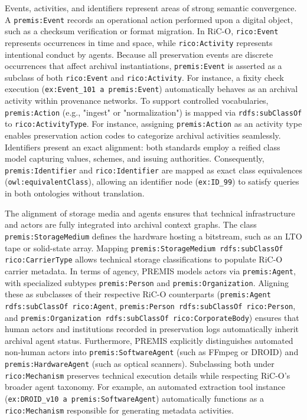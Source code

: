 \documentclass[runningheads]{llncs}
\begin{document}
Events, activities, and identifiers represent areas of strong semantic convergence. A \texttt{premis:Event} records an operational action performed upon a digital object, such as a checksum verification or format migration. In RiC-O, \texttt{rico:Event} represents occurrences in time and space, while \texttt{rico:Activity} represents intentional conduct by agents. Because all preservation events are discrete occurrences that affect archival instantiations, \texttt{premis:Event} is asserted as a subclass of both \texttt{rico:Event} and \texttt{rico:Activity}. For instance, a fixity check execution (\texttt{ex:Event\_101 a premis:Event}) automatically behaves as an archival activity within provenance networks. To support controlled vocabularies, \texttt{premis:Action} (e.g., "ingest" or "normalization") is mapped via \texttt{rdfs:subClassOf} to \texttt{rico:ActivityType}. For instance, assigning \texttt{premis:Action} as an activity type enables preservation action codes to categorize archival activities seamlessly. Identifiers present an exact alignment: both standards employ a reified class model capturing values, schemes, and issuing authorities. Consequently, \texttt{premis:Identifier} and \texttt{rico:Identifier} are mapped as exact class equivalences (\texttt{owl:equivalentClass}), allowing an identifier node (\texttt{ex:ID\_99}) to satisfy queries in both ontologies without translation.

The alignment of storage media and agents ensures that technical infrastructure and actors are fully integrated into archival context graphs. The class \texttt{premis:StorageMedium} defines the hardware hosting a bitstream, such as an LTO tape or solid-state array. Mapping \texttt{premis:StorageMedium rdfs:subClassOf rico:CarrierType} allows technical storage classifications to populate RiC-O carrier metadata. In terms of agency, PREMIS models actors via \texttt{premis:Agent}, with specialized subtypes \texttt{premis:Person} and \texttt{premis:Organization}. Aligning these as subclasses of their respective RiC-O counterparts (\texttt{premis:Agent rdfs:subClassOf rico:Agent}, \texttt{premis:Person rdfs:subClassOf rico:Person}, and \texttt{premis:Organization rdfs:subClassOf rico:CorporateBody}) ensures that human actors and institutions recorded in preservation logs automatically inherit archival agent status. Furthermore, PREMIS explicitly distinguishes automated non-human actors into \texttt{premis:SoftwareAgent} (such as FFmpeg or DROID) and \texttt{premis:HardwareAgent} (such as optical scanners). Subclassing both under \texttt{rico:Mechanism} preserves technical execution details while respecting RiC-O's broader agent taxonomy. For example, an automated extraction tool instance (\texttt{ex:DROID\_v10 a premis:SoftwareAgent}) automatically functions as a \texttt{rico:Mechanism} responsible for generating metadata activities.
\end{document}
